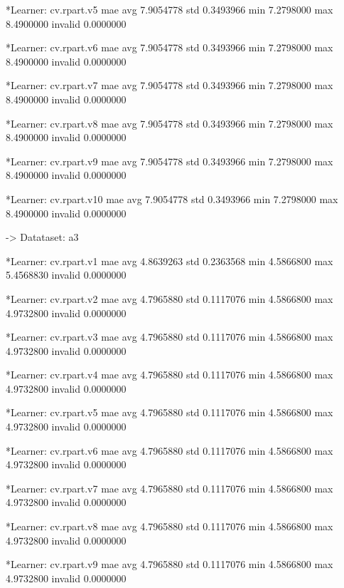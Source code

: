 \documentclass{article}
\begin{document}
\begin{Schunk}
\begin{Soutput}
	*Learner: cv.rpart.v5 
              mae
avg     7.9054778
std     0.3493966
min     7.2798000
max     8.4900000
invalid 0.0000000

	*Learner: cv.rpart.v6 
              mae
avg     7.9054778
std     0.3493966
min     7.2798000
max     8.4900000
invalid 0.0000000

	*Learner: cv.rpart.v7 
              mae
avg     7.9054778
std     0.3493966
min     7.2798000
max     8.4900000
invalid 0.0000000

	*Learner: cv.rpart.v8 
              mae
avg     7.9054778
std     0.3493966
min     7.2798000
max     8.4900000
invalid 0.0000000

	*Learner: cv.rpart.v9 
              mae
avg     7.9054778
std     0.3493966
min     7.2798000
max     8.4900000
invalid 0.0000000

	*Learner: cv.rpart.v10 
              mae
avg     7.9054778
std     0.3493966
min     7.2798000
max     8.4900000
invalid 0.0000000


-> Datataset:  a3 

	*Learner: cv.rpart.v1 
              mae
avg     4.8639263
std     0.2363568
min     4.5866800
max     5.4568830
invalid 0.0000000

	*Learner: cv.rpart.v2 
              mae
avg     4.7965880
std     0.1117076
min     4.5866800
max     4.9732800
invalid 0.0000000

	*Learner: cv.rpart.v3 
              mae
avg     4.7965880
std     0.1117076
min     4.5866800
max     4.9732800
invalid 0.0000000

	*Learner: cv.rpart.v4 
              mae
avg     4.7965880
std     0.1117076
min     4.5866800
max     4.9732800
invalid 0.0000000

	*Learner: cv.rpart.v5 
              mae
avg     4.7965880
std     0.1117076
min     4.5866800
max     4.9732800
invalid 0.0000000

	*Learner: cv.rpart.v6 
              mae
avg     4.7965880
std     0.1117076
min     4.5866800
max     4.9732800
invalid 0.0000000

	*Learner: cv.rpart.v7 
              mae
avg     4.7965880
std     0.1117076
min     4.5866800
max     4.9732800
invalid 0.0000000

	*Learner: cv.rpart.v8 
              mae
avg     4.7965880
std     0.1117076
min     4.5866800
max     4.9732800
invalid 0.0000000

	*Learner: cv.rpart.v9 
              mae
avg     4.7965880
std     0.1117076
min     4.5866800
max     4.9732800
invalid 0.0000000


\end{Soutput}
\end{Schunk}
\end{document}
